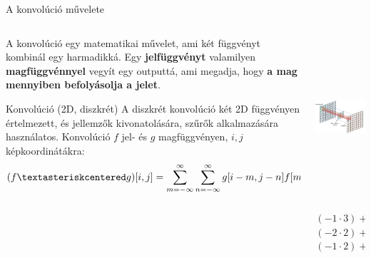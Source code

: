 \documentclass[english, aspectratio=169]{beamer}
\begin{document}
\begin{frame}{A konvolúció művelete}
\begin{columns}
\begin{column}{.6\textwidth}
A konvolúció egy matematikai művelet, ami két függvényt kombinál egy harmadikká. Egy \textbf{jelfüggvényt} valamilyen \textbf{magfüggvénnyel} vegyít egy outputtá, ami megadja, hogy \textbf{a mag mennyiben befolyásolja a jelet}. 
\begin{block}{Konvolúció (2D, diszkrét)}
A diszkrét konvolúció két 2D függvényen értelmezett, és jellemzők kivonatolására, szűrők alkalmazására használatos. Konvolúció $f$ jel- és $g$ magfüggvényen, $i,j$ képkoordinátákra:
\[
(f \textasteriskcentered g)[i, j] = \sum_{m=-\infty}^\infty \sum_{n=-\infty}^\infty g[i-m, j-n]f[m,n]
\]
\end{block}
\end{column}
\begin{column}{.4\textwidth}
\begin{center}
\includegraphics[height=6cm, width=6cm, keepaspectratio]{images/neural_10.png}
\end{center}
$(-1 \cdot 3) + (0 \cdot 0) + (1 \cdot 1) +$\\
$(-2 \cdot 2) + (0 \cdot 6) + (2 \cdot 2) +$\\
$(-1 \cdot 2) + (0 \cdot 4) + (1 \cdot 1) = -3$\\
\end{column}
\end{columns}
\end{frame}
\end{document}
